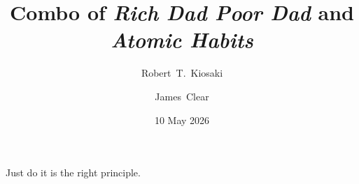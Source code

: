 \documentclass{article}
\author{Robert~T.~Kiosaki \and James~Clear}
\title{Combo of \emph{Rich Dad Poor Dad} and \emph{Atomic Habits}}
\date{10 May 2026}
\begin{document}
	\maketitle
	
	Just do it is the right principle.
\end{document}
